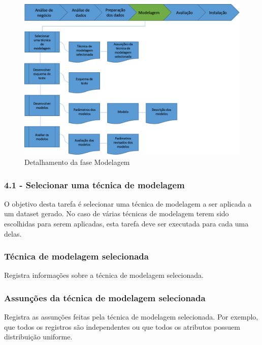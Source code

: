 \begin{figure}[H]
	\includegraphics[scale=0.8]{img/CRISP-DM-Modelagem.png}
	\caption{Detalhamento da fase Modelagem}
	\label{img:CRISP-DM-Modelagem}
\end{figure}


\subsubsection*{\textbf{4.1 - Selecionar uma técnica de modelagem}}

O objetivo desta tarefa é selecionar uma técnica de modelagem a ser aplicada a um dataset gerado. No caso de várias técnicas de modelagem terem sido escolhidas para serem aplicadas, esta tarefa deve ser executada para cada uma delas.

\subsubsection*{Técnica de modelagem selecionada}

Registra informações sobre a técnica de modelagem selecionada.

\subsubsection*{Assunções da técnica de modelagem selecionada}

Registra as assunções feitas pela técnica de modelagem selecionada. Por exemplo, que todos os registros são independentes ou que todos os atributos possuem distribuição uniforme.


